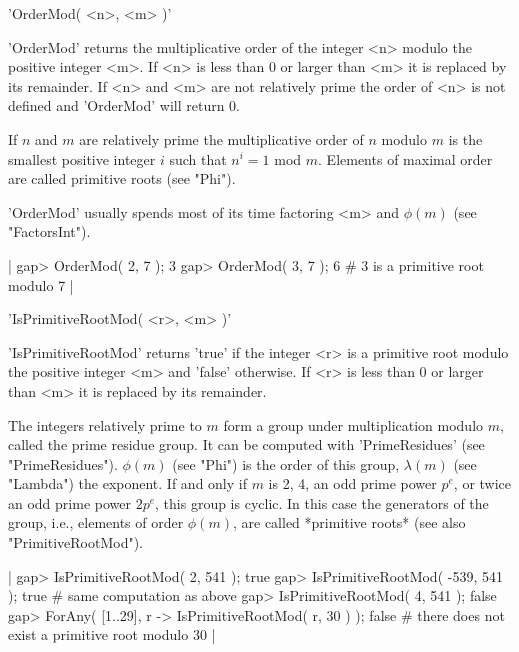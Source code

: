 %

'OrderMod( <n>, <m> )'

'OrderMod' returns the multiplicative order of the integer <n> modulo the
positive integer <m>.   If <n> is  less than 0 or  larger than  <m> it is
replaced by its remainder.  If <n> and  <m>  are not relatively prime the
order of <n> is not defined and 'OrderMod' will return 0.

If  $n$ and  $m$ are  relatively prime  the  multiplicative order of  $n$
modulo $m$ is the smallest positive  integer $i$ such that  $n^i = 1$ mod
$m$.  Elements of maximal order are called primitive roots (see "Phi").

'OrderMod' usually spends  most of its  time  factoring <m> and $\phi(m)$
(see "FactorsInt").

|    gap> OrderMod( 2, 7 );
    3
    gap> OrderMod( 3, 7 );
    6        # 3 is a primitive root modulo 7 |

%
%
%

'IsPrimitiveRootMod( <r>, <m> )'

'IsPrimitiveRootMod' returns  'true' if  the integer  <r>  is a primitive
root modulo the positive integer <m> and  'false' otherwise.  If  <r>  is
less than 0 or larger than <m> it is replaced by its remainder.

The integers  relatively prime to $m$ form  a group  under multiplication
modulo  $m$, called the  prime  residue  group.  It  can be computed with
'PrimeResidues'  (see   "PrimeResidues").   $\phi(m)$ (see  "Phi") is the
order of this  group, $\lambda(m)$  (see "Lambda") the  exponent.  If and
only if $m$  is  2, 4, an  odd prime power $p^e$, or  twice  an odd prime
power $2 p^e$, this group is cyclic.  In  this case the generators of the
group, i.e., elements of  order $\phi(m)$,  are called  *primitive roots*
(see also "PrimitiveRootMod").

|    gap> IsPrimitiveRootMod( 2, 541 );
    true
    gap> IsPrimitiveRootMod( -539, 541 );
    true        # same computation as above
    gap> IsPrimitiveRootMod( 4, 541 );
    false
    gap> ForAny( [1..29], r -> IsPrimitiveRootMod( r, 30 ) );
    false        # there does not exist a primitive root modulo 30 |

